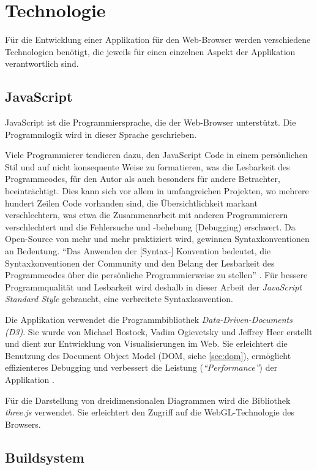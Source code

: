 \section{Technologie}

Für die Entwicklung einer Applikation für den Web-Browser werden verschiedene Technologien benötigt, die jeweils für einen einzelnen Aspekt der Applikation verantwortlich sind.

\subsection{JavaScript}

JavaScript ist die Programmiersprache, die der Web-Browser unterstützt. Die Programmlogik wird in dieser Sprache geschrieben.

Viele Programmierer tendieren dazu, den JavaScript Code in einem persönlichen Stil und auf nicht konsequente Weise zu formatieren, was die Lesbarkeit des Programmcodes, für den Autor als auch besonders für andere Betrachter, beeinträchtigt. Dies kann sich vor allem in umfangreichen Projekten, wo mehrere hundert Zeilen Code vorhanden sind, die Übersichtlichkeit markant verschlechtern, was etwa die Zusammenarbeit mit anderen Programmierern verschlechtert und die Fehlersuche und -behebung (Debugging) erschwert. Da Open-Source von mehr und mehr praktiziert wird, gewinnen Syntaxkonventionen an Bedeutung. "`Das Anwenden der [Syntax-] Konvention bedeutet, die Syntaxkonventionen der Community und den Belang der Lesbarkeit des Programmcodes über die persönliche Programmierweise zu stellen"' \cite{feross}. Für bessere Programmqualität und Lesbarkeit wird deshalb in dieser Arbeit der \textit{JavaScript Standard Style} gebraucht, eine verbreitete Syntaxkonvention.

Die Applikation verwendet die Programmbibliothek \textit{Data-Driven-Documents (D3)}. Sie wurde von Michael Bostock, Vadim Ogievetsky und Jeffrey Heer erstellt und dient zur Entwicklung von Visualisierungen im Web. Sie erleichtert die Benutzung des Document Object Model (DOM, siehe \ref{sec:dom}), ermöglicht effizienteres Debugging und verbessert die Leistung (\textit{"`Performance"'}) der Applikation \cite[Kapitel 1]{bostock}.

Für die Darstellung von dreidimensionalen Diagrammen wird die Bibliothek \textit{three.js} \cite{threejs} verwendet. Sie erleichtert den Zugriff auf die WebGL-Technologie des Browsers.

\subsection{Buildsystem}

